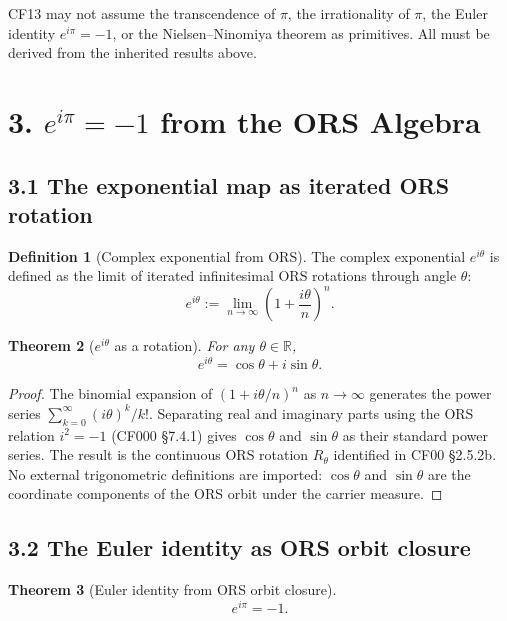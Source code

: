 \documentclass[11pt]{article}
\newtheorem{theorem}{Theorem}[section]
\theoremstyle{definition}
\newtheorem{definition}[theorem]{Definition}
\theoremstyle{remark}
\begin{document}
CF13 may not assume the transcendence of $\pi$, the irrationality of
$\pi$, the Euler identity $e^{i\pi}=-1$, or the Nielsen--Ninomiya
theorem as primitives. All must be derived from the inherited results
above.

\section{3. $e^{i\pi}=-1$ from the ORS Algebra}

\subsection{3.1 The exponential map as iterated ORS rotation}

\begin{definition}[Complex exponential from ORS]
The complex exponential $e^{i\theta}$ is defined as the limit of
iterated infinitesimal ORS rotations through angle $\theta$:
\[
e^{i\theta} := \lim_{n\to\infty}\left(1+\frac{i\theta}{n}\right)^n.
\]
\end{definition}

\begin{theorem}[$e^{i\theta}$ as a rotation]
For any $\theta\in\mathbb{R}$,
\[
e^{i\theta} = \cos\theta + i\sin\theta.
\]
\end{theorem}

\begin{proof}
The binomial expansion of $(1+i\theta/n)^n$ as $n\to\infty$ generates
the power series $\sum_{k=0}^\infty (i\theta)^k/k!$. Separating real
and imaginary parts using the ORS relation $i^2=-1$ (CF000 \S 7.4.1)
gives $\cos\theta$ and $\sin\theta$ as their standard power series.
The result is the continuous ORS rotation $R_\theta$ identified in
CF00 \S 2.5.2b. No external trigonometric definitions are imported:
$\cos\theta$ and $\sin\theta$ are the coordinate components of the
ORS orbit under the carrier measure.
\end{proof}

\subsection{3.2 The Euler identity as ORS orbit closure}

\begin{theorem}[Euler identity from ORS orbit closure]\label{thm:euler}
\[
e^{i\pi} = -1.
\]
\end{theorem}
\end{document}
